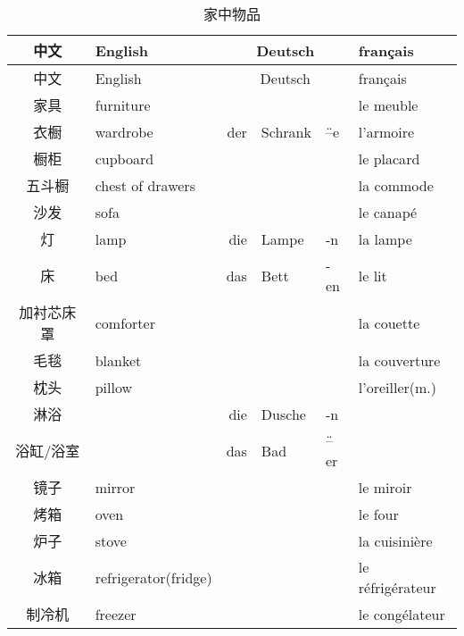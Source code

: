 \documentclass[12pt,A4paper,oneside,reqno]{amsart}
\numberwithin{equation}{section}
\theoremstyle{plain}
\theoremstyle{plain}
\theoremstyle{plain}
\numberwithin{equation}{section}
\theoremstyle{remark}
\begin{document}
\begin{longtable}{c|l|rll|l}
	\hline
	中文	&	English	&\multicolumn{3}{c|}{Deutsch} &	français  	\\
	\hline
	\endhead
	\hline
	中文	&	English	&\multicolumn{3}{c|}{Deutsch} &	français  	\\
	\hline
	\endfirsthead	
	\hline
	\endfoot
	\hline	
	\caption{家中物品}
	\endlastfoot				
家具	&	furniture	&		&		&		&	le meuble	\\
衣橱	&	wardrobe	&	der	&	Schrank	&	\"{--}e	&	l'armoire	\\
橱柜	&	cupboard	&		&		&		&	le placard	\\
五斗橱	&	chest of drawers	&		&		&		&	la commode	\\
沙发	&	sofa	&		&		&		&	le canap\'{e}	\\
灯	&	lamp	&	die	&	Lampe	&	-n	&	la lampe	\\
床	&	bed	&	das	&	Bett	&	-en	&	le lit	\\
加衬芯床罩	&	comforter	&		&		&		&	la couette	\\
毛毯	&	blanket	&		&		&		&	la couverture	\\
枕头	&	pillow	&		&		&		&	l'oreiller(m.)	\\
淋浴	&		&	die	&	Dusche	&	-n	&		\\
浴缸/浴室	&		&	das	&	Bad	&	\"{--}er	&		\\
镜子	&	mirror	&		&		&		&	le miroir	\\
烤箱	&	oven	&		&		&		&	le four	\\
炉子	&	stove	&		&		&		&	la cuisini\`{e}re	\\
冰箱	&	refrigerator(fridge)	&		&		&		&	le r\'{e}frig\'{e}rateur	\\
制冷机	&	freezer	&		&		&		&	le cong\'{e}lateur	\\


	
\end{longtable}
\end{document}
